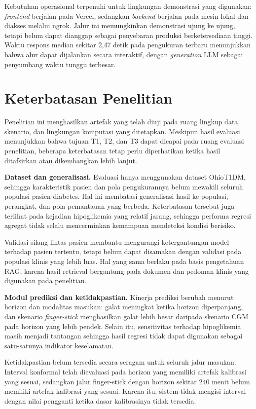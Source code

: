 Kebutuhan operasional terpenuhi untuk lingkungan demonstrasi yang digunakan: \textit{frontend} berjalan pada Vercel, sedangkan \textit{backend} berjalan
pada mesin lokal dan diakses melalui ngrok. Jalur ini memungkinkan demonstrasi ujung ke ujung, tetapi belum dapat dianggap sebagai penyebaran produksi
berketersediaan tinggi. Waktu respons median sekitar 2,47 detik pada pengukuran terbaru menunjukkan bahwa alur dapat dijalankan secara interaktif, dengan
\textit{generation} LLM sebagai penyumbang waktu tunggu terbesar.

\section{Keterbatasan Penelitian}
\label{sec:bab7-keterbatasan-penelitian}

Penelitian ini menghasilkan artefak yang telah diuji pada ruang lingkup data, skenario, dan lingkungan komputasi yang ditetapkan. Meskipun hasil evaluasi
menunjukkan bahwa tujuan T1, T2, dan T3 dapat dicapai pada ruang evaluasi penelitian, beberapa keterbatasan tetap perlu diperhatikan ketika hasil
ditafsirkan atau dikembangkan lebih lanjut.

\textbf{Dataset dan generalisasi.} Evaluasi hanya menggunakan dataset OhioT1DM, sehingga karakteristik pasien dan pola pengukurannya belum mewakili seluruh
populasi pasien diabetes. Hal ini membatasi generalisasi hasil ke populasi, perangkat, dan pola pemantauan yang berbeda. Keterbatasan tersebut juga terlihat
pada kejadian hipoglikemia yang relatif jarang, sehingga performa regresi agregat tidak selalu mencerminkan kemampuan mendeteksi kondisi berisiko.

Validasi silang lintas-pasien membantu mengurangi ketergantungan model terhadap pasien tertentu, tetapi belum dapat disamakan dengan validasi pada
populasi klinis yang lebih luas. Hal yang sama berlaku pada basis pengetahuan RAG, karena hasil retrieval bergantung pada dokumen dan pedoman klinis yang
digunakan pada penelitian.

\textbf{Modul prediksi dan ketidakpastian.} Kinerja prediksi berubah menurut horizon dan modalitas masukan: galat meningkat ketika horizon diperpanjang, dan
skenario \textit{finger-stick} menghasilkan galat lebih besar daripada skenario CGM pada horizon yang lebih pendek. Selain itu, sensitivitas terhadap hipoglikemia masih menjadi tantangan sehingga
hasil regresi tidak dapat digunakan sebagai satu-satunya indikator keselamatan.

Ketidakpastian belum tersedia secara seragam untuk seluruh jalur masukan. Interval konformal telah dievaluasi pada horizon yang memiliki artefak kalibrasi
yang sesuai, sedangkan jalur finger-stick dengan horizon sekitar 240 menit belum memiliki artefak kalibrasi yang sesuai. Karena itu, sistem tidak
mengisi interval dengan nilai pengganti ketika dasar kalibrasinya tidak tersedia.

